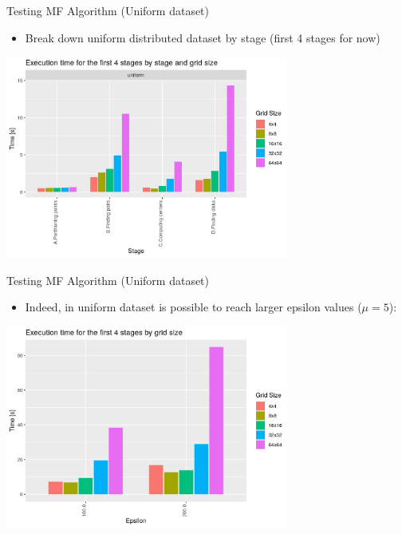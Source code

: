 \documentclass{beamer}
\begin{document}
\begin{frame}{Testing MF Algorithm (Uniform dataset)}
    \begin{itemize}
        \item Break down uniform distributed dataset by stage (first 4 stages for now)
    \end{itemize}
    \centering
    \includegraphics[width=0.7\textwidth]{figures/02_uniformByStages.png}
\end{frame}

\begin{frame}{Testing MF Algorithm (Uniform dataset)}
    \begin{itemize}
        \item Indeed, in uniform dataset is possible to reach larger epsilon values ($\mu=5$):
    \end{itemize}
    \centering
    \includegraphics[width=0.7\textwidth]{figures/03_uniformLarge.png}
\end{frame}
\end{document}

